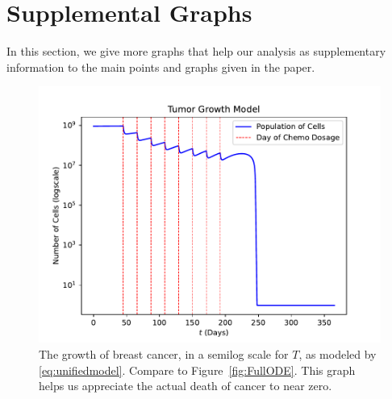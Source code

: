 \documentclass[11pt]{amsart}
\begin{document}
\newpage

\appendix

\section{Supplemental Graphs}
\label{appendix:graphs}
In this section, we give more graphs that help our analysis as supplementary information to the main points and graphs given in the paper.
\begin{figure}[H]
\vspace{-2mm}
\begin{center} %
\includegraphics[scale=0.6]{./images/growth_8T_3W_C45_semiy.pdf} %
\end{center}
\caption{The growth of breast cancer, in a semilog scale for $T$, as modeled by \eqref{eq:unifiedmodel}. Compare to Figure~\ref{fig:FullODE}. This graph helps us appreciate the actual death of cancer to near zero.}\label{fig:FullODE_semiy} %
\end{figure}
\end{document}
